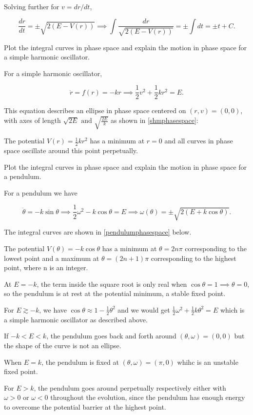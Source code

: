 \documentclass[english,a4paper,12pt]{report}
\begin{document}
Solving further for \(v = dr /dt \), 

\begin{equation}
    \frac{dr}{dt} = \pm \sqrt{2(E-V(r))} \implies \int \frac{dr}{\sqrt{2(E-V(r))} } = \pm \int dt = \pm t + C. 
\end{equation}

{Plot the integral curves in phase space and explain the motion in phase space for a simple harmonic oscillator.}
{For a simple harmonic oscillator,

\begin{equation}
    \ddot{r} = f(r) = -kr \implies  \frac{1}{2}v^2 + \frac{1}{2}kr^2 = E . 
\end{equation}

This equation describes an ellipse in phase space centered on \((r,v) = (0,0)\), with axes of length \(\sqrt{2E} \text { and } \sqrt{\frac{2E}{k} }  \) as shown in \cref{shmphasespace}:

The potential \(V(r) = \frac{1}{2} kr^2 \) has a minimum at \(r=0\) and all curves in phase space oscillate around this point perpetually.  
} 

{Plot the integral curves in phase space and explain the motion in phase space for a pendulum.}
{For a pendulum we have

\begin{equation}
    \ddot{\theta } = -k\sin \theta \implies \frac{1}{2}\omega ^2-k\cos \theta = E \implies \omega (\theta ) = \pm \sqrt{2(E+k\cos \theta )}.   
\end{equation}

The integral curves are shown in \cref{pendulumphasespace} below.

The potential \(V(\theta ) = -k\cos \theta \) has a minimum at \(\theta = 2n\pi \) corresponding to the lowest point and a maximum at \(\theta = (2n+1)\pi \) corresponding to the highest point, where n is an integer. 

At \(E = -k\), the term inside the square root is only real when \(\cos \theta = 1 \implies \theta = 0\), so the pendulum is at rest at the potential minimum, a stable fixed point. 

For \(E \gtrsim -k\), we have \(\cos \theta \approx 1-\frac{1}{2}\theta ^2 \) and we would get \(\frac{1}{2}\omega ^2 + \frac{1}{2}k \theta ^2 = E  \) which is a simple harmonic oscillator as described above. 

If \(-k < E < k\), the pendulum goes back and forth around \((\theta ,\omega ) = (0,0)\) but the shape of the curve is not an ellipse.

When \(E = k\), the pendulum is fixed at \((\theta ,\omega ) = (\pi ,0)\) whihc is an unstable fixed point.

For \(E>k\), the pendulum goes around perpetually respectively either with \(\omega > 0 \text { or } \omega <0\) throughout the evolution, since the pendulum has enough energy to overcome the potential barrier at the highest point.


} 
\end{document}
